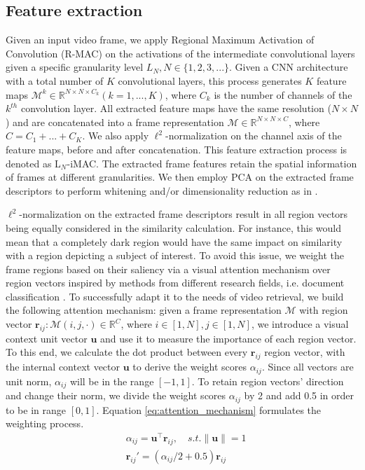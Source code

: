 \documentclass[10pt,twocolumn,letterpaper]{article}
\newcommand{\norm}[1]{\left\lVert#1\right\rVert}
\begin{document}
\subsection{Feature extraction}
\label{sec:feature_extraction}

Given an input video frame, we apply Regional Maximum Activation of Convolution (R-MAC) \cite{tolias2015} on the activations of the intermediate convolutional layers \cite{kordopatis2017a} given a specific granularity level $L_N, N\in \{1,2,3,...\}$. Given a CNN architecture with a total number of $K$ convolutional layers, this process generates $K$ feature maps $\mathcal{M}^k \in \mathbb{R}^{N \times N \times C_k} (k=1, ..., K)$, where $C_k$ is the number of channels of the $k^{th}$ convolution layer. All extracted feature maps have the same resolution ($N \times N$) and are concatenated into a frame representation $\mathcal{M} \in \mathbb{R}^{N \times N \times C}$, where $C = C_1+...+C_K$. We also apply $\ell^2$-normalization on the channel axis of the feature maps, before and after  concatenation. This feature extraction process is denoted as L$_N$-iMAC. The extracted frame features retain the spatial information of frames at different granularities. We then employ PCA on the extracted frame descriptors to perform whitening and/or dimensionality reduction as in \cite{jegou2012}. 



$\ell^2$-normalization on the extracted frame descriptors result in all region vectors being equally considered in the similarity calculation. For instance, this would mean that a completely dark region would have the same impact on similarity with a region depicting a subject of interest. To avoid this issue, we weight the frame regions based on their saliency via a visual attention mechanism over region vectors inspired by methods from different research fields, i.e. document classification \cite{yang2016}. To successfully adapt it to the needs of video retrieval, we build the following attention mechanism: given a frame representation $\mathcal{M}$ with region vector $\textbf{r}_{ij}: \mathcal{M}(i,j,\cdot) \in \mathbb{R}^{C}$, where $i\in[1,N], j\in[1,N]$, we introduce a visual context unit vector $\textbf{u}$ and use it to measure the importance of each region vector. To this end, we calculate the dot product between every $\textbf{r}_{ij}$ region vector, with the internal context vector $\textbf{u}$ to derive the weight scores $\alpha_{ij}$. Since all vectors are unit norm, $\alpha_{ij}$ will be in the range $[-1,1]$. To retain region vectors' direction and change their norm, we divide the weight scores $\alpha_{ij}$ by 2 and add 0.5 in order to be in range $[0,1]$. Equation \ref{eq:attention_mechanism} formulates the weighting process.
\begin{equation}
    \begin{aligned}
    & \alpha_{ij} = \textbf{u}^\top \textbf{r}_{ij}, \quad s.t. \norm{\textbf{u}} = 1 \\
    & \textbf{r}_{ij}' = (\alpha_{ij}/2 + 0.5)\textbf{r}_{ij}
    \end{aligned}
    \label{eq:attention_mechanism}
\end{equation}
\end{document}
